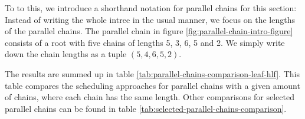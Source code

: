 To to this, we introduce a shorthand notation for parallel chains for this section: Instead of writing the whole intree in the usual manner, we focus on the lengths of the parallel chains. The parallel chain in figure \ref{fig:parallel-chain-intro-figure} consists of a root with five chains of lengths 5, 3, 6, 5 and 2. We simply write down the chain lengths as a tuple $(5,4,6,5,2)$.

The results are summed up in table \ref{tab:parallel-chains-comparison-leaf-hlf}. This table compares the scheduling approaches for parallel chains with a given amount of chains, where each chain has the same length. Other comparisons for selected parallel chains can be found in table \ref{tab:selected-parallel-chains-comparison}.

\begin{table}[ht]
  \centering
  \quad
  \caption{Parallel chains: Comparison of the number of snapshots needed by exhaustive search in contrast to HLF. Each table denotes the number of chains ($N$) to the right, and the length of each chain ($L$) downwards (the corresponding parallel chains then have the chain length sequence $\chainlengths{L_1,L_2,\dots,L_n}$, where $L_1=L_2=\dots=L_n=L$).}
  \label{tab:parallel-chains-comparison-leaf-hlf}
\end{table}

